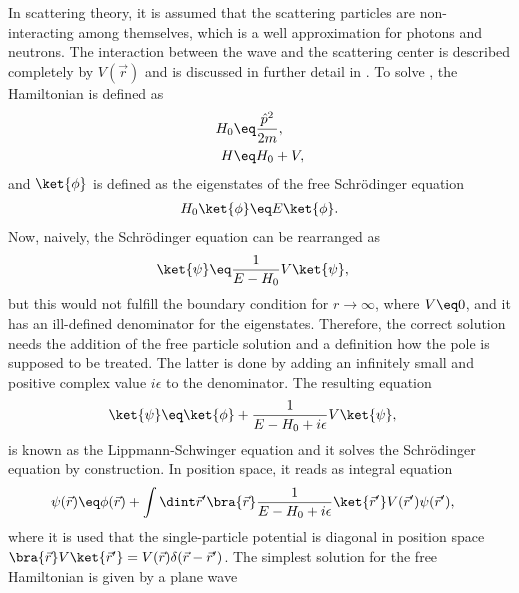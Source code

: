 \documentclass[\main/dresen_thesis.tex]{subfiles}
\begin{document}
    In scattering theory, it is assumed that the scattering particles are non-interacting among themselves, which is a well approximation for photons and neutrons.
    The interaction between the wave and the scattering center is described completely by $V(\vec{r})$ and is discussed in further detail in .
    To solve , the Hamiltonian is defined as
    \begin{align}
      H_0 &\eq \frac{\hat{p}^2}{2m},\\
      H &\eq H_0 + V,
    \end{align}
    and $\ket{\phi}$ is defined as the eigenstates of the free Schr\"odinger equation
    \begin{align}
      H_0 \ket{\phi} &\eq E \ket{\phi}.\\
    \end{align}
    Now, naively, the Schr\"odinger equation can be rearranged as
    \begin{align}
      \ket{\psi} &\eq \frac{1}{E - H_0} V \ket{\psi},
    \end{align}
    but this would not fulfill the boundary condition for $r \rightarrow \infty$, where $V\eq0$, and it has an ill-defined denominator for the eigenstates.
    Therefore, the correct solution needs the addition of the free particle solution and a definition how the pole is supposed to be treated.
    The latter is done by adding an infinitely small and positive complex value $i\epsilon$ to the denominator. The resulting equation
    \begin{align}
      \ket{\psi} &\eq \ket{\phi} +  \frac{1}{E - H_0 + i \epsilon} V \ket{\psi},
    \end{align}
    is known as the Lippmann-Schwinger equation and  it solves the Schr\"odinger equation by construction.
    In position space, it reads as integral equation
    \begin{align}
      \psi (\vec{r}) &\eq \phi(\vec{r}) + \int \dint \vec{r}^\prime \bra{\vec{r}}\frac{1}{E - H_0 + i \epsilon} \ket{\vec{r}^\prime} V (\vec{r}^\prime)\psi (\vec{r}^\prime),
      \label{eq:theoreticalBackground:scattering:scatteringTheory:LippmanSchwingerIntegralEquation}
    \end{align}
    where it is used that the single-particle potential is diagonal in position space $\bra{\vec{r}} V \ket{\vec{r}^\prime} = V(\vec{r}) \delta(\vec{r} - \vec{r}^\prime)$.
    The simplest solution for the free Hamiltonian is given by a plane wave
\end{document}
